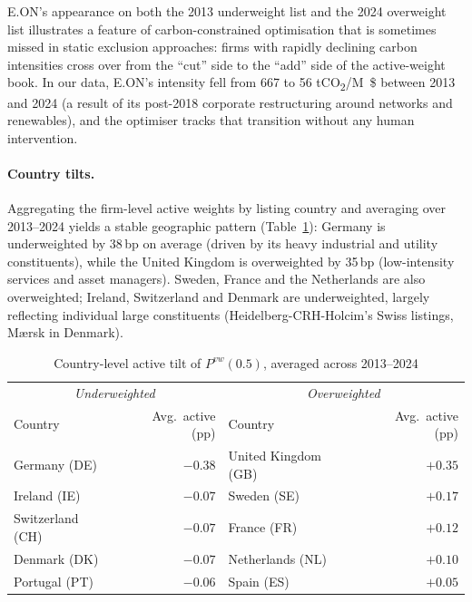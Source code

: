 \documentclass[11pt,a4paper]{article}
\begin{document}

E.ON's appearance on both the 2013 underweight list and the 2024
overweight list illustrates a feature of carbon-constrained
optimisation that is sometimes missed in static exclusion approaches:
firms with rapidly declining carbon intensities cross over from the
``cut'' side to the ``add'' side of the active-weight book. In our
data, E.ON's intensity fell from 667 to 56 \si{tCO_2/M\$} between 2013
and 2024 (a result of its post-2018 corporate restructuring around
networks and renewables), and the optimiser tracks that transition
without any human intervention.

\paragraph{Country tilts.} Aggregating the firm-level active weights
by listing country and averaging over 2013--2024 yields a stable
geographic pattern (Table~\ref{tab:country-tilt}): Germany is
underweighted by 38\,bp on average (driven by its heavy industrial
and utility constituents), while the United Kingdom is overweighted
by 35\,bp (low-intensity services and asset managers). Sweden, France
and the Netherlands are also overweighted; Ireland, Switzerland and
Denmark are underweighted, largely reflecting individual large
constituents (Heidelberg-CRH-Holcim's Swiss listings, Mærsk in
Denmark).

\begin{table}[H]
\centering
\caption{Country-level active tilt of $P^{vw}(0.5)$, averaged across
2013--2024}\label{tab:country-tilt}
\small
\begin{tabular}{l r l r}
\toprule
\multicolumn{2}{c}{\textit{Underweighted}} & \multicolumn{2}{c}{\textit{Overweighted}} \\
Country & Avg.\ active (pp) & Country & Avg.\ active (pp) \\
\midrule
Germany (DE)        & $-0.38$ & United Kingdom (GB)   & $+0.35$ \\
Ireland (IE)        & $-0.07$ & Sweden (SE)           & $+0.17$ \\
Switzerland (CH)    & $-0.07$ & France (FR)           & $+0.12$ \\
Denmark (DK)        & $-0.07$ & Netherlands (NL)      & $+0.10$ \\
Portugal (PT)       & $-0.06$ & Spain (ES)            & $+0.05$ \\
\bottomrule
\end{tabular}
\end{table}
\end{document}
